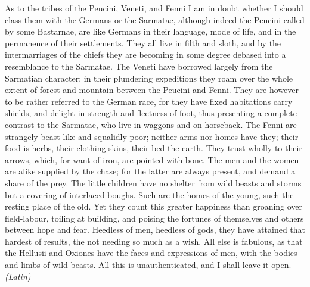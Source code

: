 
As to the tribes of the Peucini, Veneti, and Fenni I am in doubt whether I should class them with the Germans or the Sarmatae, although indeed the Peucini called by some Bastarnae, are like Germans in their language, mode of life, and in the permanence of their settlements. They all live in filth and sloth, and by the intermarriages of the chiefs they are becoming in some degree debased into a resemblance to the Sarmatae. The Veneti have borrowed largely from the Sarmatian character; in their plundering expeditions they roam over the whole extent of forest and mountain between the Peucini and Fenni. They are however to be rather referred to the German race, for they have fixed habitations carry shields, and delight in strength and fleetness of foot, thus presenting a complete contrast to the Sarmatae, who live in waggons and on horseback. The Fenni are strangely beast-like and squalidly poor; neither arms nor homes have they; their food is herbs, their clothing skins, their bed the earth. They trust wholly to their arrows, which, for want of iron, are pointed with bone. The men and the women are alike supplied by the chase; for the latter are always present, and demand a share of the prey. The little children have no shelter from wild beasts and storms but a covering of interlaced boughs. Such are the homes of the young, such the resting place of the old. Yet they count this greater happiness than groaning over field-labour, toiling at building, and poising the fortunes of themselves and others between hope and fear. Heedless of men, heedless of gods, they have attained that hardest of results, the not needing so much as a wish. All else is fabulous, as that the Hellusii and Oxiones have the faces and expressions of men, with the bodies and limbs of wild beasts. All this is unauthenticated, and I shall leave it open. \emph{(Latin)}

